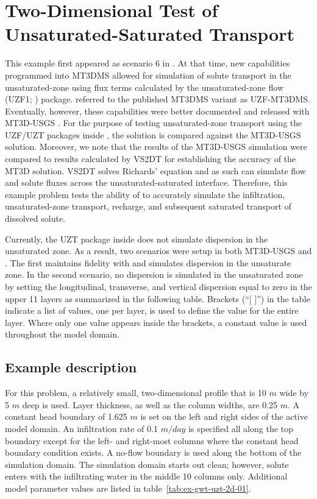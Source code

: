 \section{Two-Dimensional Test of Unsaturated-Saturated Transport}

This example first appeared as scenario 6 in \cite{morway2013}.  At that time, new capabilities programmed into MT3DMS \citep{zheng1999mt3dms} allowed for simulation of solute transport in the unsaturated-zone using flux terms calculated by the unsaturated-zone flow (UZF1; \cite{UZF}) package. \cite{morway2013} referred to the published MT3DMS variant as UZF-MT3DMS. Eventually, however, these capabilities were better documented and released with MT3D-USGS \citep{mt3dusgs}. For the purpose of testing unsaturated-zone transport using the UZF/UZT packages inside \mf, the \mf solution is compared against the MT3D-USGS solution. Moreover, we note that the results of the  MT3D-USGS simulation were compared to results calculated by VS2DT \citep{lappalaetal1987VS2D} for establishing the accuracy of the MT3D solution.  VS2DT solves Richards' equation and as such can simulate flow and solute fluxes across the unsaturated-saturated interface.  Therefore, this example problem tests the ability of \mf to accurately simulate the infiltration, unsaturated-zone transport, recharge, and subsequent saturated transport of dissolved solute.

Currently, the UZT package inside \mf does not simulate dispersion in the unsaturated zone.  As a result, two scenarios were setup in both MT3D-USGS and \mf.  The first maintains fidelity with \cite{morway2013} and simulates dispersion in the unsaturate zone.  In the second scenario, no dispersion is simulated in the unsaturated zone by setting the longitudinal, transverse, and vertical dispersion equal to zero in the upper 11 layers as summarized in the following table.  Brackets (``[ ]'') in the table indicate a list of values, one per layer, is used to define the value for the entire layer.  Where only one value appears inside the brackets, a constant value is used throughout the model domain.



\subsection{Example description}

For this problem, a relatively small, two-dimensional profile that is 10 $m$ wide by 5 $m$ deep is used.  Layer thickness, as well as the column widths, are 0.25 $m$. A constant head boundary of 1.625 $m$ is set on the left and right sides of the active model domain.  An infiltration rate of 0.1 $m/day$ is specified all along the top boundary except for the left- and right-most columns where the constant head boundary condition exists.  A no-flow boundary is used along the bottom of the simulation domain.  The simulation domain starts out clean; however, solute enters with the infiltrating water in the middle 10 columns only.  Additional model parameter values are listed in table~\ref{tab:ex-gwt-uzt-2d-01}.  

